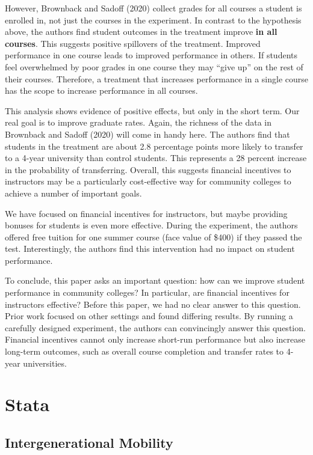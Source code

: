 \documentclass[
]{book}
\begin{document}
However, Brownback and Sadoff (2020) collect grades for all courses a student is enrolled in, not just the courses in the experiment. In contrast to the hypothesis above, the authors find student outcomes in the treatment improve \textbf{in all courses}. This suggests positive spillovers of the treatment. Improved performance in one course leads to improved performance in others. If students feel overwhelmed by poor grades in one course they may ``give up'' on the rest of their courses. Therefore, a treatment that increases performance in a single course has the scope to increase performance in all courses.

This analysis shows evidence of positive effects, but only in the short term. Our real goal is to improve graduate rates. Again, the richness of the data in Brownback and Sadoff (2020) will come in handy here. The authors find that students in the treatment are about 2.8 percentage points more likely to transfer to a 4-year university than control students. This represents a 28 percent increase in the probability of transferring. Overall, this suggests financial incentives to instructors may be a particularly cost-effective way for community colleges to achieve a number of important goals.

We have focused on financial incentives for instructors, but maybe providing bonuses for students is even more effective. During the experiment, the authors offered free tuition for one summer course (face value of \$400) if they passed the test. Interestingly, the authors find this intervention had no impact on student performance.

To conclude, this paper asks an important question: how can we improve student performance in community colleges? In particular, are financial incentives for instructors effective? Before this paper, we had no clear answer to this question. Prior work focused on other settings and found differing results. By running a carefully designed experiment, the authors can convincingly answer this question. Financial incentives cannot only increase short-run performance but also increase long-term outcomes, such as overall course completion and transfer rates to 4-year universities.

\part{Stata}\label{part-stata}

\chapter{Intergenerational Mobility}\label{intergenerational-mobility}
\end{document}
